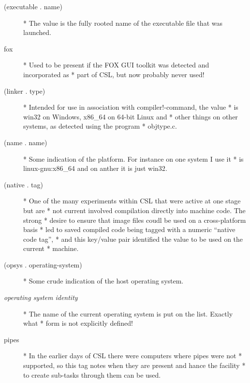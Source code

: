 \documentclass[a4paper,11pt]{article}
\begin{document}
\begin{description}
\item[{\ttfamily  (executable . name)}] 
      * The value is the fully rooted name of the executable file that was launched.

\item[{\ttfamily fox}] 
      * Used to be present if the FOX GUI toolkit was detected and incorporated as
      * part of CSL, but now probably never used!

\item[{\ttfamily (linker . type)}] 
      * Intended for use in association with {\ttfamily compiler!-command}, the value
      * is {\ttfamily win32} on Windows, {\ttfamily x86\_64} on 64-bit Linux and
      * other things on other systems, as detected using the program {\ttfamily
      * objtype.c}.

\item[{\ttfamily  (name . name)}] 
      * Some indication of the platform. For instance on one system I use it
      * is {\ttfamily linux-gnu:x86\_64} and on anther it is just {\ttfamily win32}.

\item[{\ttfamily  (native . tag)}] 
      * One of the many experiments within CSL that were active at one stage but are
      * not current involved compilation directly into machine code. The strong
      * desire to ensure that image files coudl be used on a cross-platform basis
      * led to saved compiled code being tagged with a numeric ``native code tag'',
      * and this key/value pair identified the value to be used on the current
      * machine.

\item[{\ttfamily  (opsys . operating-system)}] 
      * Some crude indication of the host operating system.

\item [{\itshape operating system identity}] 
      * The name of the current operating system is put on the list. Exactly what
      * form is not explicitly defined!

\item[{\ttfamily pipes}] 
      * In the earlier days of CSL there were computers where pipes were not
      * supported, so this tag notes when they are present and hance the facility
      * to create sub-tasks through them can be used.


\end{description}
\end{document}
